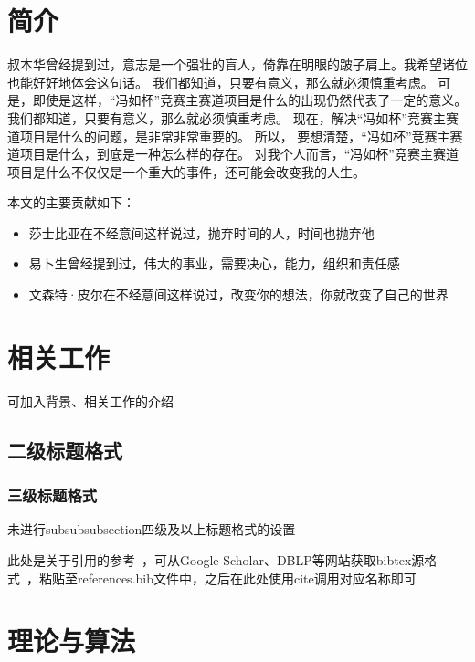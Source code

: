 \documentclass[zihao=-4]{ctexart}
\begin{document}
\section{简介}
\begin{spacing}{1.5}
叔本华曾经提到过，意志是一个强壮的盲人，倚靠在明眼的跛子肩上。我希望诸位也能好好地体会这句话。 我们都知道，只要有意义，那么就必须慎重考虑。 可是，即使是这样，“冯如杯”竞赛主赛道项目是什么的出现仍然代表了一定的意义。 我们都知道，只要有意义，那么就必须慎重考虑。 现在，解决“冯如杯”竞赛主赛道项目是什么的问题，是非常非常重要的。 所以， 要想清楚，“冯如杯”竞赛主赛道项目是什么，到底是一种怎么样的存在。 对我个人而言，“冯如杯”竞赛主赛道项目是什么不仅仅是一个重大的事件，还可能会改变我的人生。\par


本文的主要贡献如下：\par
\begin{itemize}
	\item 莎士比亚在不经意间这样说过，抛弃时间的人，时间也抛弃他
	\item 易卜生曾经提到过，伟大的事业，需要决心，能力，组织和责任感
	\item 文森特·皮尔在不经意间这样说过，改变你的想法，你就改变了自己的世界
\end{itemize}
	
\section{相关工作}
可加入背景、相关工作的介绍

\subsection{二级标题格式}
\subsubsection{三级标题格式}
未进行subsubsubsection四级及以上标题格式的设置\par

此处是关于引用的参考~\cite{Squeez}，可从Google Scholar、DBLP等网站获取bibtex源格式~\cite{Goodfellow_2015}，粘贴至references.bib文件\cite{Xu_2017Squueze}中，之后在此处使用cite调用对应名称即可~\cite{Carlini_2016}\par

\section{理论与算法}


\end{spacing}
\end{document}
